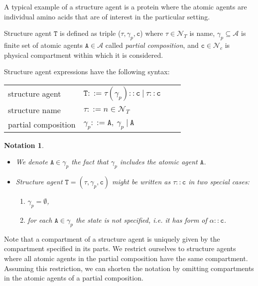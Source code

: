 \documentclass{entcs}
\renewcommand{\~}[0]{\texttildelow}
\newcommand{\choice}{|}
\newtheorem{notation}[thm]{Notation}
\begin{document}
A typical example of a structure agent is a protein where the atomic agents are individual amino acids that are of interest in the particular setting.

\begin{definition}
Structure agent $\mathtt{T}$ is defined as triple ($\tau, \gamma_p, \mathtt{c}$) where $\tau \in \mathcal{N}_{T}$ is name, $\gamma_p \subseteq \mathcal{A}$ is finite set of atomic agents $\mathtt{A} \in \mathcal{A}$ called \emph{partial composition}, and $\mathtt{c} \in \mathcal{N}_{c}$ is physical compartment within which it is considered.
\end{definition}

Structure agent expressions have the following syntax:

\begin{center}
{\small
\hspace*{-1cm}\begin{tabular}{ ll ll }
 structure agent & $\mathtt{T} ::= \tau(\gamma_p)::\mathtt{c}~\choice~\tau::\mathtt{c}$\\
 structure name & $\tau ::= n \in \mathcal{N}_{T}$\\
 partial composition & $\gamma_p ::= \mathtt{A},~\gamma_p~\choice~\mathtt{A}$\\
\end{tabular}
}
\end{center}   

\begin{notation}
~
\begin{itemize}
\item We denote $\mathtt{A}\in\gamma_p$ the fact that $\gamma_p$ includes the atomic agent $\mathtt{A}$.
\item Structure agent $\mathtt{T} = (\tau, \gamma_p, \mathtt{c})$ might be written as $\tau::\mathtt{c}$ in two special cases:
	\begin{enumerate}
		\item $\gamma_p = \emptyset$,
		\item for each $\mathtt{A} \in \gamma_p$ the state is not specified, i.e. it has form of $\alpha::\mathtt{c}$.
	\end{enumerate}
\end{itemize}
\end{notation}

Note that a compartment of a structure agent is uniquely given by the compartment specified in its parts. We restrict ourselves to structure agents where all atomic agents in the partial composition have the same compartment. Assuming this restriction, we can shorten the notation by omitting compartments in the atomic agents of a partial composition. 
\end{document}
